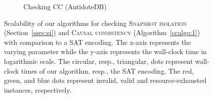 \begin{figure}
 \begin{subfigure}{.33\textwidth}
  \caption{Checking CC (AntidoteDB)}
  \label{cc_session_scale}
 \end{subfigure}
 \caption{Scalability of our algorithms for checking \textsc{Snapshot isolation} (Section~\ref{ssec:si}) and  \textsc{Causal consistency} (Algorithm~\ref{ccalgo:1}) with comparison to a SAT encoding. The x-axis represents the varying parameter while the y-axis represents the wall-clock time in logarithmic scale. The circular, resp., triangular, dots represent wall-clock times of our algorithm, resp., the SAT encoding. The red, green, and blue dots represent invalid, valid and resource-exhausted instances, respectively.}
 \label{si_cc_performace_scale}
\end{figure}

